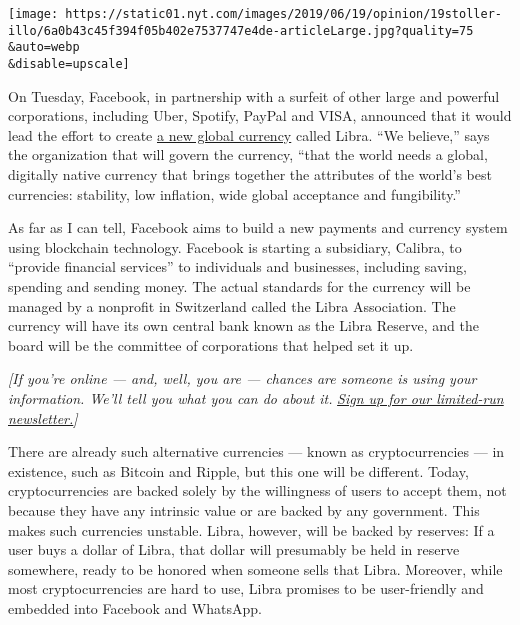 \texttt{[image: https://static01.nyt.com/images/2019/06/19/opinion/19stoller-illo/6a0b43c45f394f05b402e7537747e4de-articleLarge.jpg?quality=75\\\&auto=webp\\\&disable=upscale]}

On Tuesday, Facebook, in partnership with a surfeit of other large and
powerful corporations, including Uber, Spotify, PayPal and VISA,
announced that it would lead the effort to create
\href{https://www.nytimes.com/2019/06/18/technology/facebook-cryptocurrency-libra.html}{a
new global currency} called Libra. ``We believe,'' says the organization
that will govern the currency, ``that the world needs a global,
digitally native currency that brings together the attributes of the
world's best currencies: stability, low inflation, wide global
acceptance and fungibility.''

As far as I can tell, Facebook aims to build a new payments and currency
system using blockchain technology. Facebook is starting a subsidiary,
Calibra, to ``provide financial services'' to individuals and
businesses, including saving, spending and sending money. The actual
standards for the currency will be managed by a nonprofit in Switzerland
called the Libra Association. The currency will have its own central
bank known as the Libra Reserve, and the board will be the committee of
corporations that helped set it up.

\emph{{[}If you're online --- and, well, you are --- chances are someone
is using your information. We'll tell you what you can do about it.}
\href{https://www.nytimes.com/newsletters/privacy-project?action=click\&module=Intentional\&pgtype=Article}{\emph{Sign
up for our limited-run newsletter.}}\emph{{]}}

There are already such alternative currencies --- known as
cryptocurrencies --- in existence, such as Bitcoin and Ripple, but this
one will be different. Today, cryptocurrencies are backed solely by the
willingness of users to accept them, not because they have any intrinsic
value or are backed by any government. This makes such currencies
unstable. Libra, however, will be backed by reserves: If a user buys a
dollar of Libra, that dollar will presumably be held in reserve
somewhere, ready to be honored when someone sells that Libra. Moreover,
while most cryptocurrencies are hard to use, Libra promises to be
user-friendly and embedded into Facebook and WhatsApp.

